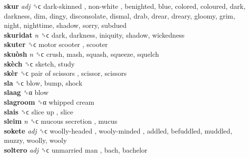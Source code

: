 \textbf{skur} \emph{adj}  ␝ϲ   dark-skinned ,  non-white , benighted, blue, colored, coloured, dark, darkness, dim, dingy, disconsolate, dismal, drab, drear, dreary, gloomy, grim, night, nighttime, shadow, sorry, subdued  \\
\textbf{skuridat} \emph{n}  ␝ϲ  dark, darkness, iniquity, shadow, wickedness  \\
\textbf{skuter} ␝ϲ   motor scooter , scooter  \\
\textbf{skuòsh} \emph{n}  ␝ϲ  crush, mash, squash, squeeze, squelch  \\
\textbf{skèch} ␝ϲ  sketch, study  \\
\textbf{skèr} ␝ϲ   pair of scissors , scissor, scissors  \\
\textbf{sla} ␝ϲ  blow, bump, shock  \\
\textbf{slaag} ␝α  blow  \\
\textbf{slagroom} ␝α   whipped cream   \\
\textbf{slais} ␝ϲ   slice up , slice  \\
\textbf{sleim} \emph{n}  ␝ϲ   mucous secretion , mucus  \\
\textbf{sokete} \emph{adj}  ␝ϲ   woolly-headed ,  wooly-minded , addled, befuddled, muddled, muzzy, woolly, wooly  \\
\textbf{soltero} \emph{adj}  ␝ϲ   unmarried man , bach, bachelor  \\
